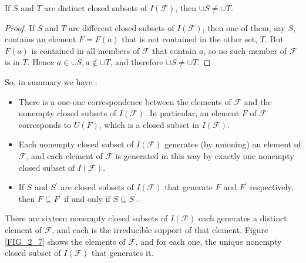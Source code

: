 \begin{lemma}\label{lem_2_7}
    If $S$ and $T$ are distinct closed subsets of $I(\mathcal{F})$, then $\cup S \neq \cup T$.
\end{lemma}

\begin{proof}
    If $S$ and $T$ are different closed subsets of $I(\mathcal{F})$, then one of them, say $S$, contains an element $F=F(a)$ that is not contained in the other set, $T$. But $F(a)$ is contained in all members of $\mathcal{F}$ that contain $a$, so no such member of $\mathcal{F}$ is in $T$. Hence $a \in \cup S, a \notin \cup T$, and therefore $\cup S \neq \cup T$.
\end{proof}
\newpage
\begin{theo}
So, in summary we have :
\begin{itemize}
    \item There is a one-one correspondence between the elements of $\mathcal{F}$ and the nonempty closed subsets of $I(\mathcal{F})$. In particular, an element $F$ of $\mathcal{F}$ corresponds to $U(F)$, which is a closed subset in $I(\mathcal{F})$.
    \item Each nonempty closed subset of $I(\mathcal{F})$ generates (by unioning) an element of $\mathcal{F}$, and each element of $\mathcal{F}$ is generated in this way by exactly one nonempty closed subset of $I(\mathcal{F})$.
    \item If $S$ and $S^{\prime}$ are closed subsets of $I(\mathcal{F})$ that generate $F$ and $F^{\prime}$ respectively, then $F \subseteq F^{\prime}$ if and only if $S \subseteq S^{\prime}$.
\end{itemize}
\end{theo}

\begin{exmp}\label{exmp_2_7}
    There are sixteen nonempty closed subsets of $I(\mathcal{F})$ each generates a distinct element of $\mathcal{F}$, and each is the irreducible support of that element. Figure \ref{FIG_2_7} shows the elements of $\mathcal{F}$, and for each one, the unique nonempty closed subset of $I(\mathcal{F})$ that generates it.
\end{exmp}

